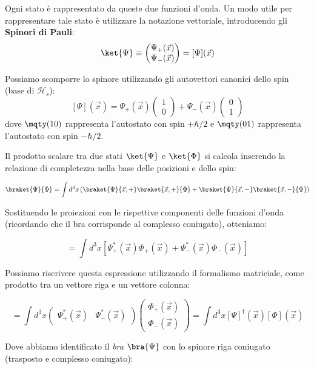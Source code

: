 Ogni stato è rappresentato da queste due funzioni d'onda. Un modo utile per rappresentare tale stato è utilizzare la notazione vettoriale, introducendo gli \textbf{Spinori di Pauli}:
\[
    \ket{\Psi} \equiv \begin{pmatrix} \Psi_+(\vec{x}) \\ \Psi_-(\vec{x}) \end{pmatrix} = [\Psi](\vec{x})
\]

Possiamo scomporre lo spinore utilizzando gli autovettori canonici dello spin (base di \( \mathcal{H}_s \)):
\[
    [\Psi](\vec{x}) = \Psi_+(\vec{x}) \begin{pmatrix} 1 \\ 0 \end{pmatrix} + \Psi_-(\vec{x}) \begin{pmatrix} 0 \\ 1 \end{pmatrix}
\]
dove \( \mqty(1\\0) \) rappresenta l'autostato con spin \( +\hbar/2 \) e \( \mqty(0\\1) \) rappresenta l'autostato con {spin \( -\hbar/2 \).}


Il prodotto scalare tra due stati \( \ket{\Psi} \) e \( \ket{\Phi} \) si calcola inserendo la relazione di completezza nella base delle posizioni e dello spin:

\[
\braket{\Psi}{\Phi} = \int d^3x \left( \braket{\Psi}{\vec{x}, +}\braket{\vec{x}, +}{\Phi} + \braket{\Psi}{\vec{x}, -}\braket{\vec{x}, -}{\Phi} \right)
\]

Sostituendo le proiezioni con le rispettive componenti delle funzioni d'onda (ricordando che il bra corrisponde al complesso coniugato), otteniamo:

\[
= \int d^3x \left[ \Psi_+^*(\vec{x}) \Phi_+(\vec{x}) + \Psi_-^*(\vec{x}) \Phi_-(\vec{x}) \right]
\]

Possiamo riscrivere questa espressione utilizzando il formalismo matriciale, come prodotto tra un vettore riga e un vettore colonna:

\[
= \int d^3x \begin{pmatrix} \Psi_+^*(\vec{x}) & \Psi_-^*(\vec{x}) \end{pmatrix} \begin{pmatrix} \Phi_+(\vec{x}) \\ \Phi_-(\vec{x}) \end{pmatrix} 
= \int d^3x [\Psi]^\dagger(\vec{x}) [\Phi](\vec{x})
\]

Dove abbiamo identificato il \textit{bra} \( \bra{\Psi} \) con lo spinore riga coniugato (trasposto e complesso coniugato):

